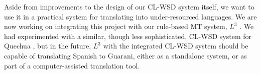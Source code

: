 \documentclass[11pt,letterpaper]{article}
\begin{document}
Aside from improvements to the design of our CL-WSD system itself, we want to
use it in a practical system for translating into under-resourced languages.
We are now working on integrating this project with our rule-based MT system,
$L^3$ \cite{gasser:aflat2012}. We had experimented with a similar, though less
sophisticated, CL-WSD system for Quechua \cite{rudnick:2011:RANLPStud}, but in
the future, $L^3$ with the integrated CL-WSD system should be capable of
translating Spanish to Guarani, either as a standalone system, or as part of a
computer-assisted translation tool.



{}
\end{document}
